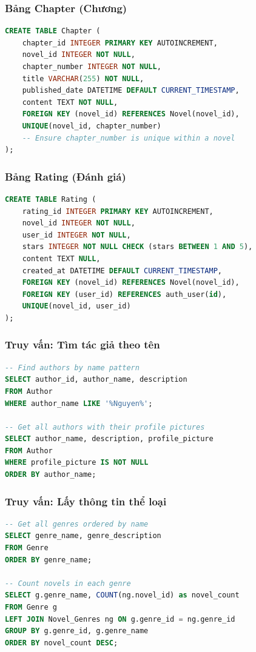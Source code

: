 \documentclass[12pt,aspectratio=169,handout]{beamer}
\begin{document}
\begin{frame}[fragile]
\frametitle{Bảng Chapter (Chương)}
\begin{lstlisting}[language=SQL, basicstyle=\small\ttfamily]
CREATE TABLE Chapter (
    chapter_id INTEGER PRIMARY KEY AUTOINCREMENT,
    novel_id INTEGER NOT NULL,
    chapter_number INTEGER NOT NULL,
    title VARCHAR(255) NOT NULL,
    published_date DATETIME DEFAULT CURRENT_TIMESTAMP,
    content TEXT NOT NULL,
    FOREIGN KEY (novel_id) REFERENCES Novel(novel_id),
    UNIQUE(novel_id, chapter_number)
    -- Ensure chapter_number is unique within a novel
);
\end{lstlisting}
\end{frame}

\begin{frame}[fragile]
\frametitle{Bảng Rating (Đánh giá)}
\begin{lstlisting}[language=SQL, basicstyle=\small\ttfamily]
CREATE TABLE Rating (
    rating_id INTEGER PRIMARY KEY AUTOINCREMENT,
    novel_id INTEGER NOT NULL,
    user_id INTEGER NOT NULL,
    stars INTEGER NOT NULL CHECK (stars BETWEEN 1 AND 5),
    content TEXT NULL,
    created_at DATETIME DEFAULT CURRENT_TIMESTAMP,
    FOREIGN KEY (novel_id) REFERENCES Novel(novel_id),
    FOREIGN KEY (user_id) REFERENCES auth_user(id),
    UNIQUE(novel_id, user_id)
);
\end{lstlisting}
\end{frame}

\begin{frame}[fragile]
\frametitle{Truy vấn: Tìm tác giả theo tên}
\begin{lstlisting}[language=SQL, basicstyle=\small\ttfamily]
-- Find authors by name pattern
SELECT author_id, author_name, description 
FROM Author 
WHERE author_name LIKE '%Nguyen%';

-- Get all authors with their profile pictures
SELECT author_name, description, profile_picture
FROM Author 
WHERE profile_picture IS NOT NULL
ORDER BY author_name;
\end{lstlisting}
\end{frame}

\begin{frame}[fragile]
\frametitle{Truy vấn: Lấy thông tin thể loại}
\begin{lstlisting}[language=SQL, basicstyle=\small\ttfamily]
-- Get all genres ordered by name
SELECT genre_name, genre_description 
FROM Genre 
ORDER BY genre_name;

-- Count novels in each genre
SELECT g.genre_name, COUNT(ng.novel_id) as novel_count
FROM Genre g
LEFT JOIN Novel_Genres ng ON g.genre_id = ng.genre_id
GROUP BY g.genre_id, g.genre_name
ORDER BY novel_count DESC;
\end{lstlisting}
\end{frame}
\end{document}

